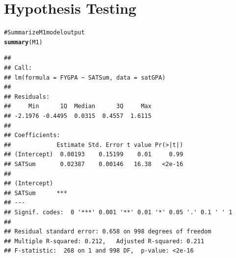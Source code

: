 \documentclass{beamer}\usepackage{graphicx, color}
\makeatletter
\newcommand{\hlfunctioncall}[1]{\textcolor[rgb]{0.501960784313725,0,0.329411764705882}{\textbf{#1}}}%
\newcommand{\hlcomment}[1]{\textcolor[rgb]{0.180392156862745,0.6,0.341176470588235}{#1}}%
\newenvironment{kframe}{%
 \def\at@end@of@kframe{}%
 \ifinner\ifhmode%
  \def\at@end@of@kframe{\end{minipage}}%
  \begin{minipage}{\columnwidth}%
 \fi\fi%
 \def\FrameCommand##1{\hskip\@totalleftmargin \hskip-\fboxsep
 \colorbox{shadecolor}{##1}\hskip-\fboxsep
     \hskip-\linewidth \hskip-\@totalleftmargin \hskip\columnwidth}%
 \MakeFramed {\advance\hsize-\width
   \@totalleftmargin\z@ \linewidth\hsize
   \@setminipage}}%
 {\par\unskip\endMakeFramed%
 \at@end@of@kframe}
\newenvironment{knitrout}{}{} %
\makeatother
\begin{document}
\section{Hypothesis Testing}




\begin{frame}
\begin{knitrout}
\color{fgcolor}\begin{kframe}
\begin{alltt}
\hlcomment{# Summarize M1 model output}
\hlfunctioncall{summary}(M1)
\end{alltt}
\begin{verbatim}
## 
## Call:
## lm(formula = FYGPA ~ SATSum, data = satGPA)
## 
## Residuals:
##     Min      1Q  Median      3Q     Max 
## -2.1976 -0.4495  0.0315  0.4557  1.6115 
## 
## Coefficients:
##             Estimate Std. Error t value Pr(>|t|)
## (Intercept)  0.00193    0.15199    0.01     0.99
## SATSum       0.02387    0.00146   16.38   <2e-16
##                
## (Intercept)    
## SATSum      ***
## ---
## Signif. codes:  0 '***' 0.001 '**' 0.01 '*' 0.05 '.' 0.1 ' ' 1 
## 
## Residual standard error: 0.658 on 998 degrees of freedom
## Multiple R-squared: 0.212,	Adjusted R-squared: 0.211 
## F-statistic:  268 on 1 and 998 DF,  p-value: <2e-16
\end{verbatim}
\end{kframe}
\end{knitrout}

\end{frame}
\end{document}

